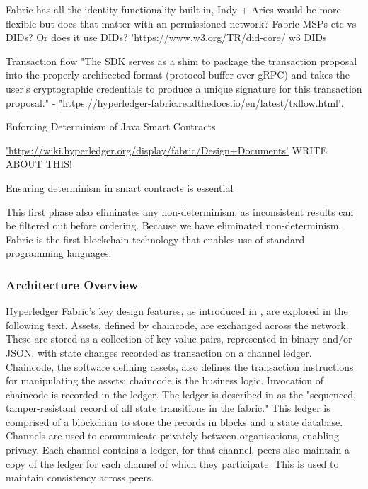 Fabric has all the identity functionality built in, Indy + Aries would be more flexible but does that matter with an permissioned network? Fabric MSPs etc vs DIDs? Or does it use DIDs? \url{'https://www.w3.org/TR/did-core/'}{w3 DIDs}


Transaction flow "The SDK serves as a shim to package the transaction proposal into the properly architected format (protocol buffer over gRPC) and takes the user’s cryptographic credentials to produce a unique signature for this transaction proposal." - \url{"https://hyperledger-fabric.readthedocs.io/en/latest/txflow.html'}.\linebreak[1]


Enforcing Determinism of Java Smart Contracts \cite{spoto_enforcing_2020}

\url{'https://wiki.hyperledger.org/display/fabric/Design+Documents'} WRITE ABOUT THIS!

Ensuring determinism in smart contracts is essential %

This first phase also eliminates any non-determinism, as inconsistent results can be filtered out before ordering.
Because we have eliminated non-determinism, Fabric is the first blockchain technology that enables use of standard programming languages. \cite{androulaki_hyperledger_2018}

\subsubsection{Architecture Overview}

Hyperledger Fabric's key design features, as introduced in \cite{androulaki_hyperledger_2018}, are explored in the following text.
Assets, defined by chaincode, are exchanged across the network. These are stored as a collection of key-value pairs, represented in binary and/or JSON, with state changes recorded as transaction on a channel ledger. 
Chaincode, the software defining assets, also defines the transaction instructions for manipulating the assets; chaincode is the business logic. Invocation of chaincode is recorded in the ledger.
The ledger is described in \cite{noauthor_hyperledger_nodate} as the "sequenced, tamper-resistant record of all state transitions in the fabric." This ledger is comprised of a blockchian to store the records in blocks and a state database. 
Channels are used to communicate privately between organisations, enabling privacy.
Each channel contains a ledger, for that channel, peers also maintain a copy of the ledger for each channel of which they participate. This is used to maintain consistency across peers. 


